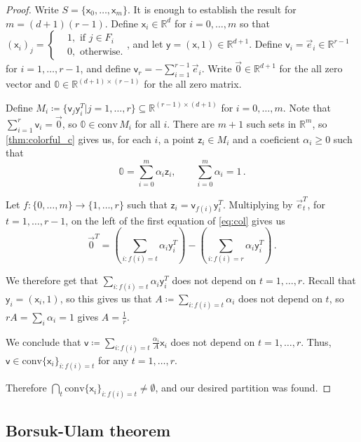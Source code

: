 \documentclass[12pt]{amsart}
\theoremstyle{definition}
\newcommand{\R}{\mathbb{R}}
\newcommand{\vv}{\mathsf{v}}
\newcommand{\vx}{\mathsf{x}}
\newcommand{\vy}{\mathsf{y}}
\newcommand{\vz}{\mathsf{z}}
\newcommand{\conv}{\mathrm{conv}}
\begin{document}
\begin{proof}
Write $S = \{\vx_0, \ldots, \vx_m\}$.
It is enough to establish the result for $m = (d+1)(r-1)$.
Define $\vx_i \in \R^{d}$ for $i = 0, \ldots, m$ so that $(\vx_i)_j = \begin{cases}&1, \text{ if $j \in F_i$ } \\  &0, \text{ otherwise.}\end{cases}$, and let $\vy = (\vx, 1) \in \R^{d+1}$.
Define $\vv_i = \vec{e}_i \in\R^{r-1}$ for $i = 1, \ldots, r-1$, and define $\vv_r = - \sum_{i=1}^{r-1} \vec{e}_i$.
Write $\vec{0} \in\R^{d+1}$ for the all zero vector and $\mathbb{0} \in \R^{(d+1)\times (r-1)}$ for the all zero matrix.

Define $M_i \coloneqq \{\vv_j\vy^T_i | j=1, \ldots, r \} \subseteq \R^{(r-1) \times (d+1)}$ for $i = 0, \ldots, m$.
Note that $\sum_{i=1}^r \vv_i = \vec{0}$, so $\mathbb{0} \in \conv \, M_i$ for all $i$.
There are $m+1$ such sets in $\R^m$, so \cref{thm:colorful_c} gives us, for each $i$, a point $\vz_i\in M_i$ and a coeficient $\alpha_i\geq 0$ such that 
\begin{equation}\label{eq:col}
 \mathbb{0} = \sum_{i=0}^m \alpha_i \vz_i , \quad \quad \sum_{i=0}^m \alpha_i = 1\, . 
\end{equation}

Let $f:\{0, \ldots, m\} \to \{1, \ldots, r\}$ such that $\vz_i = \vv_{f(i)}\vy_i^T$.
Multiplying by $\vec{e}_t^T$, for $t = 1, \ldots, r-1$, on the left of the first equation of \eqref{eq:col} gives us 
$$ \vec{0}^T = \left( \sum_{i: f(i) = t} \alpha_i \vy_i^T\right) - \left(\sum_{i: f(i) = r} \alpha_i \vy_i^T \right) \, . $$

We therefore get that $ \sum_{i: f(i) = t} \alpha_i \vy_i^T$ does not depend on $t = 1, \ldots, r$.
Recall that $\vy_i = (\vx_i, 1)$, so this gives us that $A \coloneqq  \sum_{i: f(i) = t} \alpha_i$ does not depend on $t$, so $r A = \sum_i \alpha_i = 1$ gives $A = \frac{1}{r}$.

We conclude that $\vv \coloneqq \sum_{i: f(i) = t} \frac{\alpha_i}{A}\vx_i$ does not depend on $t=1, \ldots, r$.
Thus, $\vv \in \conv\{\vx_i\}_{i: f(i) = t}$ for any $t=1, \ldots, r$.

Therefore $\bigcap_t \conv\{\vx_i\}_{i: f(i) = t}\neq \emptyset$, and our desired partition was found.
\end{proof}

\subsection{Borsuk-Ulam theorem}
\end{document}
